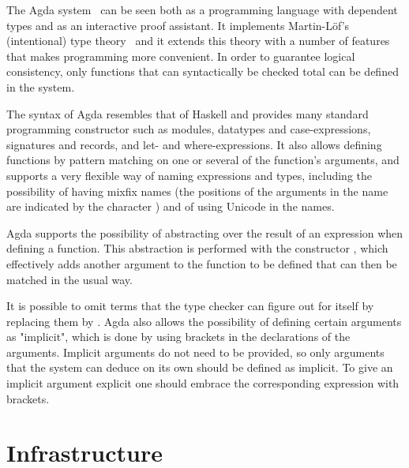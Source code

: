 \documentclass{entcs}
\begin{document}
The Agda system~\cite{agdawiki} can be seen both as a programming language with dependent types and as an interactive proof assistant. It implements Martin-Löf's (intentional) type theory~\cite{mlof90} and it extends this theory with a number of features that makes programming more convenient. In order to guarantee logical consistency, only functions that can syntactically be checked total can be defined in the system.

The syntax of Agda resembles that of Haskell and provides many standard programming constructor such as modules, datatypes and case-expressions, signatures and records, and let- and where-expressions. It also allows defining functions by pattern matching on one or several of the function's arguments, and supports a very flexible way of naming expressions and types, including the possibility of having mixfix names (the positions of the arguments in the name are indicated by the character \AgdaSymbol{\_}) and of using Unicode in the names.

Agda supports the possibility of abstracting over the result of an expression when defining a function. This abstraction is performed with the constructor , which effectively adds another argument to the function to be defined that can then be matched in the usual way.

It is possible to omit terms that the type checker can figure out for itself by replacing them by \AgdaSymbol{\_}. Agda also allows the possibility of defining certain arguments as "implicit", which is done by using brackets in the declarations of the arguments. Implicit arguments do not need to be provided, so only arguments that the system can deduce on its own should be defined as implicit. To give an implicit argument explicit one should embrace the corresponding expression with brackets. 



\section{Infrastructure}
\label{sec:infra}

 \hspace{5px}

 \hspace{5px}

 \hspace{5px}
\end{document}
